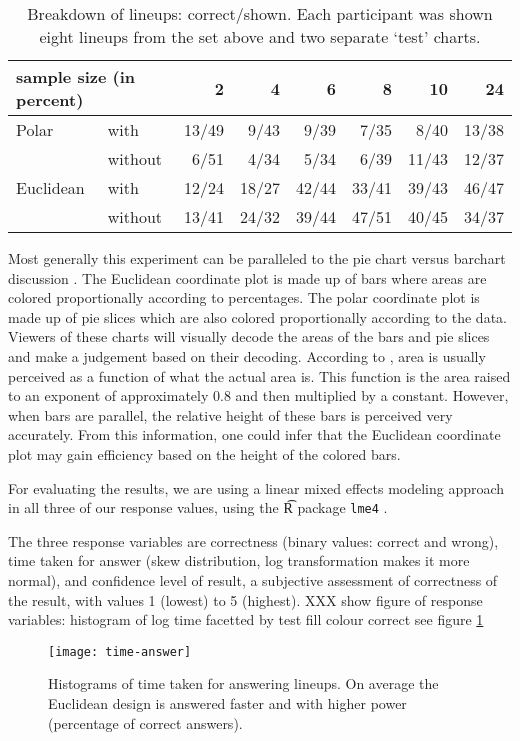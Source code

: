 \begin{table}[hbtp]
\resizebox{\linewidth}{!} {
	\begin{tabular}{ll|@{}r|@{}r|@{}r|@{}r|@{}r|@{}r}
	\multicolumn{2}{l}{sample size (in percent)}  & 2 & 4 & 6 & 8 & 10 & 24 \\ [1pt] \hline
	Polar & with & 13/49& 9/43 & 9/39 & 7/35 & 8/40 & 13/38 \\
	& without & 6/51&   4/34 &  5/34 &  6/39 & 11/43 &  12/37\\ [1pt] \hline
	Euclidean & with &12/24& 18/27 & 42/44 & 33/41 & 39/43 & 46/47\\
	& without & 13/41 &24/32& 39/44 & 47/51 & 40/45 & 34/37\\
	\end{tabular}
	}
\caption{\label{tbl:treatment} Breakdown of lineups: correct/shown. Each participant was shown eight lineups from the set above and two separate `test' charts.}
\end{table}

Most generally this experiment can be paralleled to the pie chart versus barchart discussion \cite{}. 
The Euclidean coordinate plot is made up of bars where areas are colored proportionally according to percentages. The polar coordinate plot is made up of pie slices which are also colored proportionally according to the data. 
Viewers of these charts will visually decode the areas of the bars and pie slices and make a judgement based on their decoding. According to  \citet[page=40]{kosslyn:2006}, area is usually perceived as a function of what the actual area is. This function is the area raised to an exponent of approximately 0.8 and then multiplied by a constant. However, when bars are parallel, the relative height of these bars is perceived very accurately. From this information, one could infer that the Euclidean coordinate plot may gain efficiency based on the height of the colored bars. 


For evaluating the results, we are using a linear mixed effects modeling \cite{pinheiro:2000} approach in all three of our response values, using the {\t R} package {\tt lme4} \cite{bates:2011}. 

The three response variables are correctness (binary values: correct and wrong),  time taken for answer (skew distribution, log transformation makes it more normal), and confidence level of result, a subjective assessment of correctness of the result, with values 1 (lowest) to 5 (highest).
XXX show figure of response variables: histogram of log time facetted by test fill colour correct see figure \ref{fig:time}
\begin{figure}[htbp] %
   \centering
   \texttt{[image: time-answer]} 
   \caption{Histograms of time taken for answering lineups. On average the Euclidean design is answered faster and with higher power (percentage of correct answers). }
   \label{fig:time}
\end{figure}

